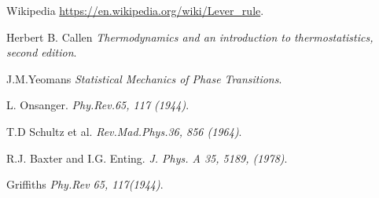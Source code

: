 
\cleardoublepage
{}
\begin{thebibliography}{99}

Wikipedia 
\url{https://en.wikipedia.org/wiki/Lever_rule}.

Herbert B. Callen
\textit{Thermodynamics and an introduction to thermostatistics, second edition}.

J.M.Yeomans
\textit{Statistical Mechanics of Phase Transitions}.

L. Onsanger.
\textit{Phy.Rev.65, 117 (1944)}. 

T.D Schultz et al.
\textit{Rev.Mad.Phys.36, 856 (1964)}. 

R.J. Baxter and I.G. Enting.
\textit{J. Phys. A 35, 5189, (1978)}. 


Griffiths
\textit{Phy.Rev 65, 117(1944)}. 

 

%

\end{thebibliography}